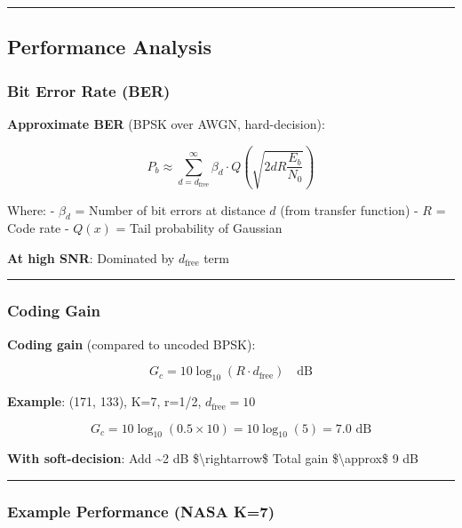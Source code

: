 \begin{center}\rule{0.5\linewidth}{0.5pt}\end{center}

\subsection{Performance Analysis}\label{performance-analysis}

\subsubsection{Bit Error Rate (BER)}\label{bit-error-rate-ber}

\textbf{Approximate BER} (BPSK over AWGN, hard-decision):

\[
P_b \approx \sum_{d=d_{\text{free}}}^{\infty} \beta_d \cdot Q\left(\sqrt{2 d R \frac{E_b}{N_0}}\right)
\]

Where: - \(\beta_d\) = Number of bit errors at distance \(d\) (from
transfer function) - \(R\) = Code rate - \(Q(x)\) = Tail probability of
Gaussian

\textbf{At high SNR}: Dominated by \(d_{\text{free}}\) term

\begin{center}\rule{0.5\linewidth}{0.5pt}\end{center}

\subsubsection{Coding Gain}\label{coding-gain}

\textbf{Coding gain} (compared to uncoded BPSK):

\[
G_c = 10 \log_{10}(R \cdot d_{\text{free}}) \quad \text{dB}
\]

\textbf{Example}: (171, 133), K=7, r=1/2, \(d_{\text{free}}=10\)

\[
G_c = 10 \log_{10}(0.5 \times 10) = 10 \log_{10}(5) = 7.0 \text{ dB}
\]

\textbf{With soft-decision}: Add \textasciitilde2 dB
\$\textbackslash rightarrow\$ Total gain \$\textbackslash approx\$ 9 dB

\begin{center}\rule{0.5\linewidth}{0.5pt}\end{center}

\subsubsection{Example Performance (NASA
K=7)}\label{example-performance-nasa-k7}

